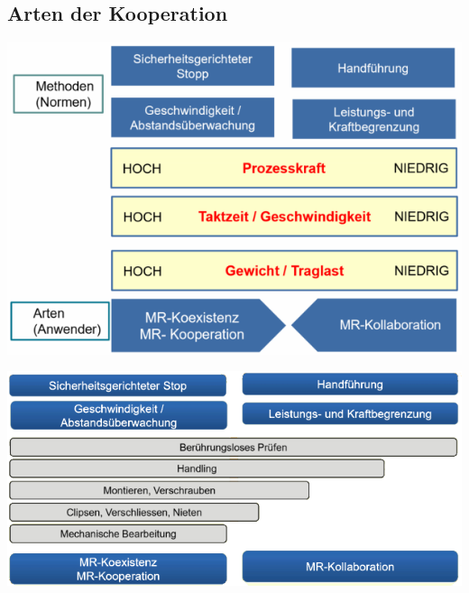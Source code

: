 \subsection{Arten der Kooperation}
\begin{minipage}{0.5\linewidth}
\includegraphics[width=0.8\linewidth]{./bilder/ArtenKooperation}
\end{minipage}
\begin{minipage}{0.5\linewidth}
\includegraphics[width=\linewidth]{./bilder/ArtenAnwendungen}
\end{minipage}
